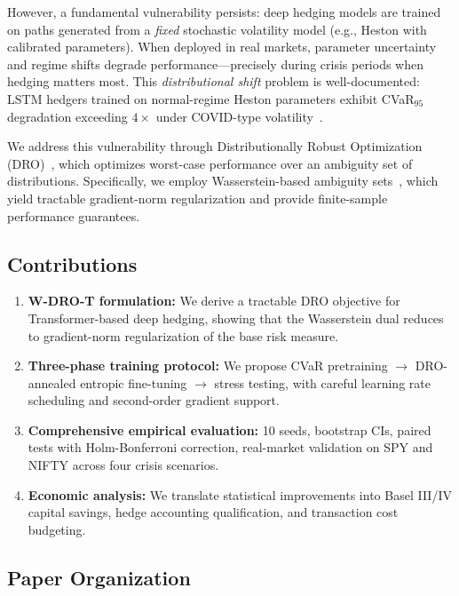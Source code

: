 \documentclass[11pt]{article}
\begin{document}
However, a fundamental vulnerability persists: deep hedging models are trained on paths generated from a \emph{fixed} stochastic volatility model (e.g., Heston with calibrated parameters). When deployed in real markets, parameter uncertainty and regime shifts degrade performance---precisely during crisis periods when hedging matters most. This \emph{distributional shift} problem is well-documented: LSTM hedgers trained on normal-regime Heston parameters exhibit CVaR$_{95}$ degradation exceeding $4\times$ under COVID-type volatility~\citep{horvath2021deep}.

We address this vulnerability through Distributionally Robust Optimization (DRO)~\citep{rahimian2019dro}, which optimizes worst-case performance over an ambiguity set of distributions. Specifically, we employ Wasserstein-based ambiguity sets~\citep{blanchet2019quantifying}, which yield tractable gradient-norm regularization and provide finite-sample performance guarantees.

\subsection{Contributions}

\begin{enumerate}[leftmargin=*,noitemsep]
    \item \textbf{W-DRO-T formulation:} We derive a tractable DRO objective for Transformer-based deep hedging, showing that the Wasserstein dual reduces to gradient-norm regularization of the base risk measure.
    
    \item \textbf{Three-phase training protocol:} We propose CVaR pretraining $\to$ DRO-annealed entropic fine-tuning $\to$ stress testing, with careful learning rate scheduling and second-order gradient support.
    
    \item \textbf{Comprehensive empirical evaluation:} 10 seeds, bootstrap CIs, paired tests with Holm-Bonferroni correction, real-market validation on SPY and NIFTY across four crisis scenarios.
    
    \item \textbf{Economic analysis:} We translate statistical improvements into Basel III/IV capital savings, hedge accounting qualification, and transaction cost budgeting.
\end{enumerate}

\subsection{Paper Organization}
\end{document}
